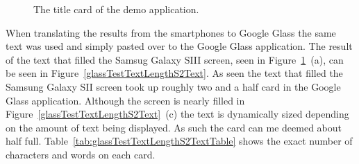 	\begin{figure}[H]%
		\centering
   		 \qquad
   		 \qquad
		\caption{The title card of the demo application.}
		\label{glassTestTextLengthRaw}
	\end{figure}

When translating the results from the smartphones to Google Glass the same text was used and simply pasted over to the Google Glass application. The result of the text that filled the Samsug Galaxy SIII screen, seen in Figure~\ref{glassTestTextLengthRaw}~(a), can be seen in Figure~\ref{glassTestTextLengthS2Text}. As seen the text that filled the Samsung Galaxy SII screen took up roughly two and a half card in the Google Glass application. Although the screen is nearly filled in Figure~\ref{glassTestTextLengthS2Text}~(c) the text is dynamically sized depending on the amount of text being displayed. As such the card can me deemed about half full. Table~\ref{tab:glassTestTextLengthS2TextTable} shows the exact number of characters and words on each card.

